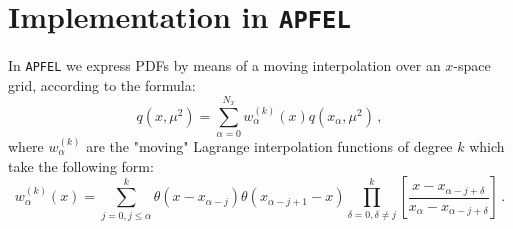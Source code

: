 \documentclass[10pt,a4paper]{article}
\begin{document}
\section{Implementation in {\tt APFEL}}

In {\tt APFEL} we express PDFs by means of a moving interpolation over
an $x$-space grid, according to the formula:
\begin{equation}
{q}(x,\mu^2)=\sum^{N_{x}}_{\alpha=0}w_{\alpha}^{(k)}(x){q}(x_{\alpha},\mu^2)\,,
\end{equation}
where $w_{\alpha}^{(k)}$ are the "moving" Lagrange interpolation
functions of degree $k$ which take the following form:
\begin{equation}\label{LagrangeFormula}
w_{\alpha}^{(k)}(x) = \sum_{j=0,j \leq \alpha}^{k}\theta(x-x_{\alpha-j})\theta(x_{\alpha-j+1}-x)\prod^{k}_{\delta=0,\delta\ne j}\left[\frac{x-x_{\alpha-j+\delta}}{x_{\alpha}-x_{\alpha-j+\delta}}\right]\,.
\end{equation}
\end{document}
